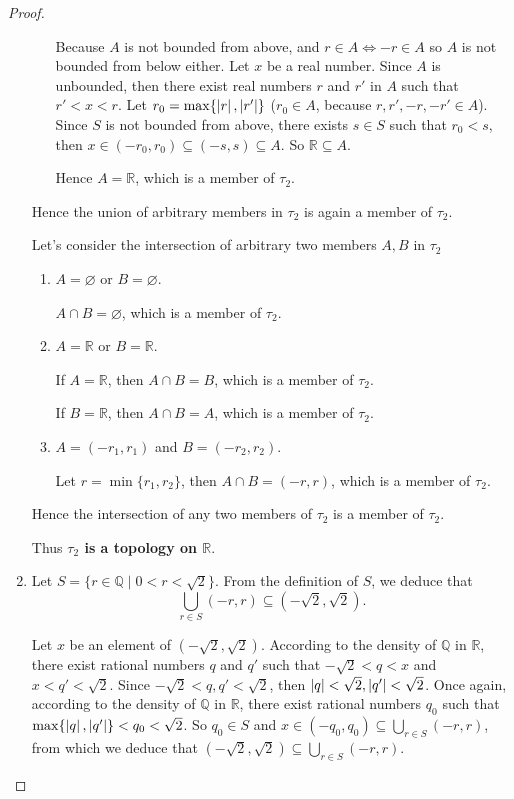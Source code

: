 \begin{proof}
\begin{enumerate}[label={(\roman*)}]
\begin{enumerate}[label={\textbf{Case \arabic*.}},itemindent=1cm]
			            Because $A$ is not bounded from above, and $r\in A\Longleftrightarrow -r\in A$ so $A$ is not bounded from below either. Let $x$ be a real number. Since $A$ is unbounded, then there exist real numbers $r$ and $r'$ in $A$ such that $r' < x < r$. Let $r_{0} = \max\{ \left\vert{r}\right\vert, \left\vert{r'}\right\vert \}$ ($r_{0}\in A$, because $r, r', -r, -r'\in A$). Since $S$ is not bounded from above, there exists $s\in S$ such that $r_{0} < s$, then $x\in (-r_{0}, r_{0})\subseteq (-s, s)\subseteq A$. So $\mathbb{R}\subseteq A$.

			            Hence $A = \mathbb{R}$, which is a member of $\tau_{2}$.
		      \end{enumerate}

		      Hence the union of arbitrary members in $\tau_{2}$ is again a member of $\tau_{2}$.

		      Let's consider the intersection of arbitrary two members $A, B$ in $\tau_{2}$
		      \begin{enumerate}[label={\textbf{Case \arabic*.}},itemindent=1cm]
			      \item $A = \varnothing$ or $B = \varnothing$.

			            $A\cap B = \varnothing$, which is a member of $\tau_{2}$.
			      \item $A = \mathbb{R}$ or $B = \mathbb{R}$.

			            If $A = \mathbb{R}$, then $A\cap B = B$, which is a member of $\tau_{2}$.

			            If $B = \mathbb{R}$, then $A\cap B = A$, which is a member of $\tau_{2}$.
			      \item $A = (-r_{1}, r_{1})$ and $B = (-r_{2}, r_{2})$.

			            Let $r = \min\{ r_{1}, r_{2} \}$, then $A\cap B = (-r, r)$, which is a member of $\tau_{2}$.
		      \end{enumerate}

		      Hence the intersection of any two members of $\tau_{2}$ is a member of $\tau_{2}$.

		      Thus \textbf{$\tau_{2}$ is a topology on $\mathbb{R}$}.
		\item Let $S = \{ r\in\mathbb{Q} \mid 0 < r < \sqrt{2} \}$. From the definition of $S$, we deduce that
		      \[
			      \bigcup_{r\in S} (-r, r)\subseteq (-\sqrt{2}, \sqrt{2}).
		      \]

		      Let $x$ be an element of $(-\sqrt{2}, \sqrt{2})$. According to the density of $\mathbb{Q}$ in $\mathbb{R}$, there exist rational numbers $q$ and $q'$ such that $-\sqrt{2} < q < x$ and $x < q' < \sqrt{2}$. Since $-\sqrt{2} < q, q' < \sqrt{2}$, then $\left\vert{q}\right\vert < \sqrt{2}, \left\vert{q'}\right\vert < \sqrt{2}$. Once again, according to the density of $\mathbb{Q}$ in $\mathbb{R}$, there exist rational numbers $q_{0}$ such that $\max\{ \left\vert{q}\right\vert, \left\vert{q'}\right\vert \} < q_{0} < \sqrt{2}$. So $q_{0}\in S$ and $x\in (-q_{0}, q_{0})\subseteq \bigcup_{r\in S} (-r, r)$, from which we deduce that $(-\sqrt{2}, \sqrt{2})\subseteq \bigcup_{r\in S}(-r, r)$.


\end{enumerate}
\end{proof}
